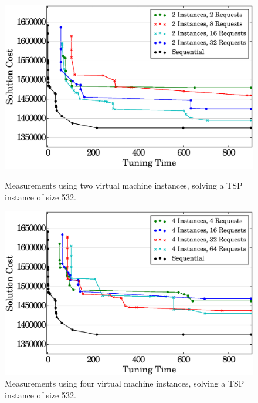 \documentclass[12pt]{article}
\begin{document}

\begin{figure}[htpb]
    \centering
    \begin{minipage}{.45\textwidth}
        \centering
        \includegraphics[scale=.35]{i2_p_n_comparison}
        \caption{Measurements using two virtual machine instances, solving
                 a TSP instance of size 532.}
        \label{fig:high-level}
    \end{minipage}%
    \hfill
    \begin{minipage}{.45\textwidth}
        \centering
        \includegraphics[scale=.35]{i4_p_n_comparison}
        \caption{Measurements using four virtual machine instances,
                 solving a TSP instance of size 532.}
        \label{fig:low-level}
    \end{minipage}%
    \label{fig:archs}
\end{figure}
\end{document}
